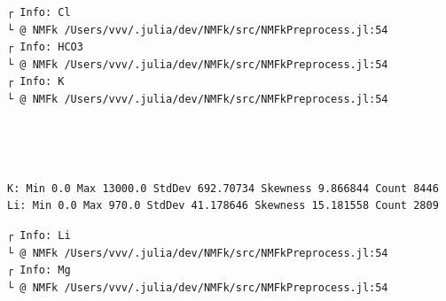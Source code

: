 \documentclass[11pt]{article}
\begin{document}
    \begin{Verbatim}[commandchars=\\\{\}]
┌ Info: Cl
└ @ NMFk /Users/vvv/.julia/dev/NMFk/src/NMFkPreprocess.jl:54
┌ Info: HCO3
└ @ NMFk /Users/vvv/.julia/dev/NMFk/src/NMFkPreprocess.jl:54
┌ Info: K
└ @ NMFk /Users/vvv/.julia/dev/NMFk/src/NMFkPreprocess.jl:54
    \end{Verbatim}

    \begin{center}
    \end{center}
    { \hspace*{\fill} \\}
    
    \begin{center}
    \end{center}
    { \hspace*{\fill} \\}
    
    \begin{Verbatim}[commandchars=\\\{\}]
K: Min 0.0 Max 13000.0 StdDev 692.70734 Skewness 9.866844 Count 8446
Li: Min 0.0 Max 970.0 StdDev 41.178646 Skewness 15.181558 Count 2809
    \end{Verbatim}

    \begin{Verbatim}[commandchars=\\\{\}]
┌ Info: Li
└ @ NMFk /Users/vvv/.julia/dev/NMFk/src/NMFkPreprocess.jl:54
┌ Info: Mg
└ @ NMFk /Users/vvv/.julia/dev/NMFk/src/NMFkPreprocess.jl:54
    \end{Verbatim}

    \begin{center}
    \end{center}
    { \hspace*{\fill} \\}
    
    \begin{center}
    \end{center}
    { \hspace*{\fill} \\}
    
\end{document}
